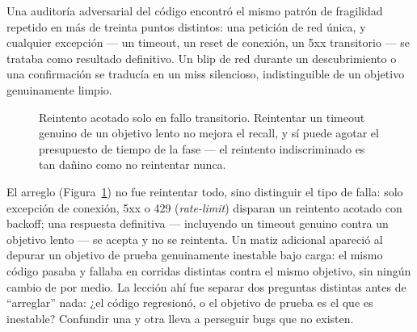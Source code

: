 \documentclass[10pt]{article}
\begin{document}
Una auditoría adversarial del código encontró el mismo patrón de fragilidad repetido en más de treinta puntos distintos: una petición de red única, y cualquier excepción --- un timeout, un reset de conexión, un 5xx transitorio --- se trataba como resultado definitivo. Un blip de red durante un descubrimiento o una confirmación se traducía en un miss silencioso, indistinguible de un objetivo genuinamente limpio.

\begin{figure}[h]
\centering
{}
\caption{Reintento acotado solo en fallo transitorio. Reintentar un timeout genuino de un objetivo lento no mejora el recall, y sí puede agotar el presupuesto de tiempo de la fase --- el reintento indiscriminado es tan dañino como no reintentar nunca.}
\label{fig:retry}
\end{figure}

El arreglo (Figura~\ref{fig:retry}) no fue reintentar todo, sino distinguir el tipo de falla: solo excepción de conexión, 5xx o 429 (\textit{rate-limit}) disparan un reintento acotado con backoff; una respuesta definitiva --- incluyendo un timeout genuino contra un objetivo lento --- se acepta y no se reintenta. Un matiz adicional apareció al depurar un objetivo de prueba genuinamente inestable bajo carga: el mismo código pasaba y fallaba en corridas distintas contra el mismo objetivo, sin ningún cambio de por medio. La lección ahí fue separar dos preguntas distintas antes de ``arreglar'' nada: ¿el código regresionó, o el objetivo de prueba es el que es inestable? Confundir una y otra lleva a perseguir bugs que no existen.
\end{document}
